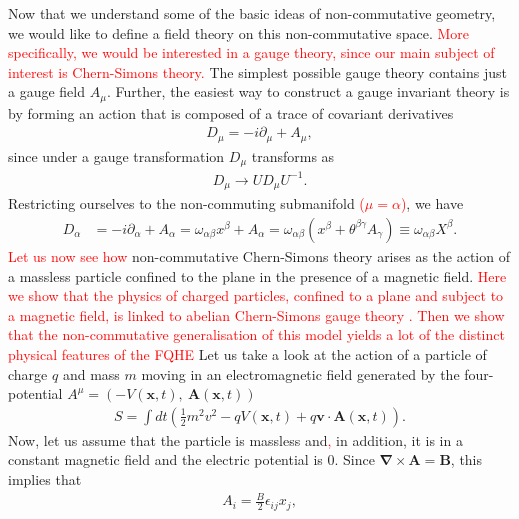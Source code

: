     Now that we understand some of the basic ideas of non-commutative geometry, we would like to define a field theory on this non-commutative space. \textcolor{red}{More specifically, we would be interested in a gauge theory, since our main subject of interest is Chern-Simons theory.} The simplest possible gauge theory contains just a gauge field $A_{\mu}$. Further, the easiest way to construct a gauge invariant theory is by forming an action that is composed of a trace of covariant derivatives 
    \begin{align}
        D_{\mu} = -i \partial_{\mu} + A_{\mu},
    \end{align}
    since under a gauge transformation $D_{\mu}$ transforms as
    \begin{align}
        D_{\mu} \rightarrow U D_{\mu} U^{-1}.
    \end{align}
    Restricting ourselves to the non-commuting submanifold \textcolor{red}{($\mu=\alpha$)}, we have
    \begin{align}
        D_{\alpha} &= -i \partial_{\alpha} + A_{\alpha} = \omega_{\alpha \beta}x^{\beta}+ A_{\alpha} = \omega_{\alpha \beta} \left( x^{\beta}+ \theta^{\beta \gamma} A_{\gamma} \right) \equiv \omega_{\alpha \beta} X^{\beta}.
    \end{align}
    \textcolor{red}{Let us now see how} non-commutative Chern-Simons theory arises as the action of a massless particle confined to the plane in the presence of a magnetic field.  \textcolor{red}{Here we show that the physics of charged particles, confined to a plane and subject to a magnetic field, is linked to abelian Chern-Simons gauge theory \cite{Dunne1993, PhysRevD.41.661}. Then we show that the non-commutative generalisation of this model yields a lot of the distinct physical features of the FQHE \cite{Polychronakos:2001mi}} Let us take a look at the action of a particle of charge $q$ and mass $m$ moving in an electromagnetic field generated by the four-potential $A^{\mu} = \left(-V(\bm{x}, t), \ \bm{A}(\bm{x},t)\right)$
    \begin{align}
        S = \int dt \left(\frac{1}{2} m^2 v^2 - q V(\bm{x},t) + q \bm{v} \cdot \bm{A}(\bm{x},t)\right). \label{eq:Lagrangian_Charged_Particle_In_EM_Field}
    \end{align}
    Now, let us assume that the particle is massless and\textcolor{red}{,} in addition, it is in a constant magnetic field and the electric potential is 0. Since $\bm{\nabla} \times \bm{A} = \bm{B}$, this implies that
    \begin{align}
        A_i = \frac{B}{2} \epsilon_{i j} x_j \label{eq:Gauge_Potential_Constant_B_Field},
    \end{align}
